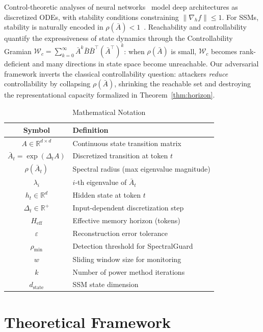 \documentclass[10pt,twocolumn]{article}
\begin{document}
Control-theoretic analyses of neural networks~\cite{haber2017stable,ruthotto2020deep} model deep architectures as discretized ODEs, with stability conditions constraining $\|\nabla_h f\| \le 1$. For SSMs, stability is naturally encoded in $\rho(\bar{A})<1$~\cite{orvieto2023resurrecting}. Reachability and controllability~\cite{kalman1960contributions} quantify the expressiveness of state dynamics through the Controllability Gramian $\mathcal{W}_c = \sum_{k=0}^{\infty} \bar{A}^k \bar{B}\bar{B}^\top (\bar{A}^\top)^k$: when $\rho(\bar{A})$ is small, $\mathcal{W}_c$ becomes rank-deficient and many directions in state space become unreachable. Our adversarial framework inverts the classical controllability question: attackers \emph{reduce} controllability by collapsing $\rho(\bar{A})$, shrinking the reachable set and destroying the representational capacity formalized in Theorem~\ref{thm:horizon}.

\begin{table}[t]
\centering
\caption{Mathematical Notation}
\label{tab:notation}
\small
\begin{tabular}{cl}
\toprule
\textbf{Symbol} & \textbf{Definition} \\
\midrule
$A \in \mathbb{R}^{d \times d}$ & Continuous state transition matrix \\
$\bar{A}_t = \exp(\Delta_t A)$ & Discretized transition at token $t$ \\
$\rho(\bar{A}_t)$ & Spectral radius (max eigenvalue magnitude) \\
$\lambda_i$ & $i$-th eigenvalue of $\bar{A}_t$ \\
$h_t \in \mathbb{R}^d$ & Hidden state at token $t$ \\
$\Delta_t \in \mathbb{R}^+$ & Input-dependent discretization step \\
$H_{\text{eff}}$ & Effective memory horizon (tokens) \\
$\varepsilon$ & Reconstruction error tolerance \\
$\rho_{\min}$ & Detection threshold for SpectralGuard \\
$w$ & Sliding window size for monitoring \\
$k$ & Number of power method iterations \\
$d_{\text{state}}$ & SSM state dimension \\
\bottomrule
\end{tabular}
\end{table}

\section{Theoretical Framework}
\label{sec:theory}
\end{document}
